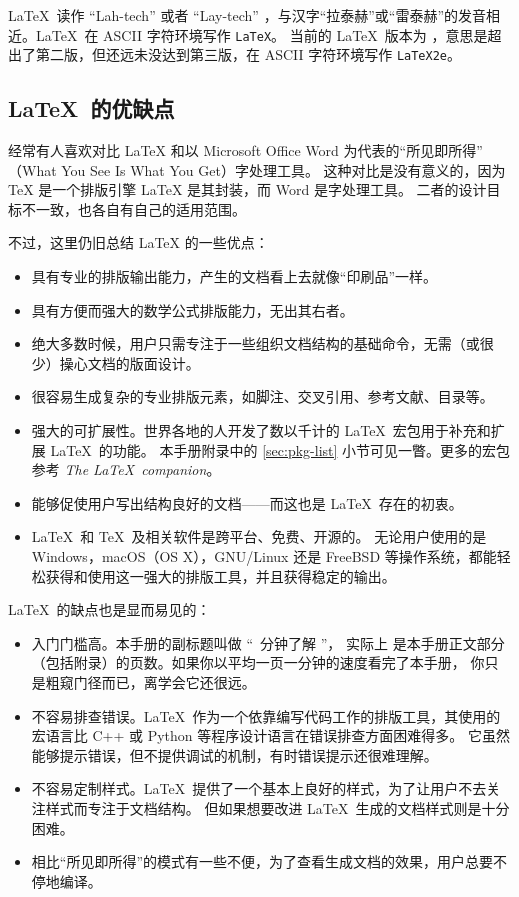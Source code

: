 \LaTeX\ 读作 ``Lah-tech'' 或者 ``Lay-tech'' ，与汉字“拉泰赫”或“雷泰赫”的发音相近。\LaTeX\ 在 ASCII 字符环境写作 \texttt{LaTeX}。
当前的 \LaTeX\ 版本为 \LaTeXe ，意思是超出了第二版，但还远未没达到第三版，在 ASCII 字符环境写作 \texttt{LaTeX2e}。

\subsection{\LaTeX\ 的优缺点}\label{subec:advs}

经常有人喜欢对比 \LaTeX{} 和以 Microsoft Office Word 为代表的“所见即所得”%
（What You See Is What You Get）字处理工具。
这种对比是没有意义的，因为 \TeX{} 是一个排版引擎 \LaTeX{} 是其封装，而 Word 是字处理工具。
二者的设计目标不一致，也各自有自己的适用范围。

不过，这里仍旧总结 \LaTeX{} 的一些优点：
\begin{itemize}
  \item 具有专业的排版输出能力，产生的文档看上去就像“印刷品”一样。
  \item 具有方便而强大的数学公式排版能力，无出其右者。
  \item 绝大多数时候，用户只需专注于一些组织文档结构的基础命令，无需（或很少）操心文档的版面设计。
  \item 很容易生成复杂的专业排版元素，如脚注、交叉引用、参考文献、目录等。
  \item 强大的可扩展性。世界各地的人开发了数以千计的 \LaTeX\ 宏包用于补充和扩展 \LaTeX\ 的功能。
  本手册附录中的 \ref{sec:pkg-list} 小节可见一瞥。更多的宏包参考 \textit{The \LaTeX\ companion}\cite{companion}。
  \item 能够促使用户写出结构良好的文档——而这也是 \LaTeX\ 存在的初衷。
  \item \LaTeX\ 和 \TeX\ 及相关软件是跨平台、免费、开源的。
  无论用户使用的是 Windows，macOS（OS X），GNU/Linux 还是 FreeBSD 等操作系统，都能轻松获得和使用这一强大的排版工具，并且获得稳定的输出。
\end{itemize}

\LaTeX\ 的缺点也是显而易见的：
\begin{itemize}
  \item 入门门槛高。本手册的副标题叫做 “\pageref{lshort-minutes}~分钟了解 \LaTeXe ”，
  实际上 \pageref{lshort-minutes} 是本手册正文部分（包括附录）的页数。如果你以平均一页一分钟的速度看完了本手册，
  你只是粗窥门径而已，离学会它还很远。
  \item 不容易排查错误。\LaTeX\ 作为一个依靠编写代码工作的排版工具，其使用的宏语言比 C++ 或 Python 等程序设计语言在错误排查方面困难得多。
  它虽然能够提示错误，但不提供调试的机制，有时错误提示还很难理解。
  \item 不容易定制样式。\LaTeX\ 提供了一个基本上良好的样式，为了让用户不去关注样式而专注于文档结构。
  但如果想要改进 \LaTeX\ 生成的文档样式则是十分困难。
  \item 相比“所见即所得”的模式有一些不便，为了查看生成文档的效果，用户总要不停地编译。
\end{itemize}

